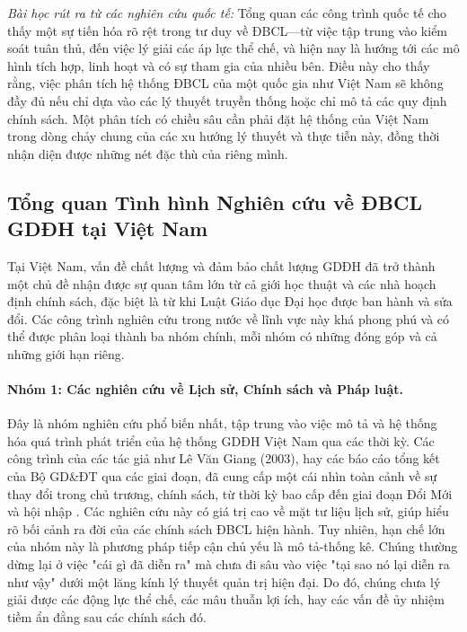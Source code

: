 \documentclass[12pt, a4paper, openany]{report}
\begin{document}
\textit{Bài học rút ra từ các nghiên cứu quốc tế:} Tổng quan các công trình quốc tế cho thấy một sự tiến hóa rõ rệt trong tư duy về ĐBCL—từ việc tập trung vào kiểm soát tuân thủ, đến việc lý giải các áp lực thể chế, và hiện nay là hướng tới các mô hình tích hợp, linh hoạt và có sự tham gia của nhiều bên. Điều này cho thấy rằng, việc phân tích hệ thống ĐBCL của một quốc gia như Việt Nam sẽ không đầy đủ nếu chỉ dựa vào các lý thuyết truyền thống hoặc chỉ mô tả các quy định chính sách. Một phân tích có chiều sâu cần phải đặt hệ thống của Việt Nam trong dòng chảy chung của các xu hướng lý thuyết và thực tiễn này, đồng thời nhận diện được những nét đặc thù của riêng mình.



\subsection{Tổng quan Tình hình Nghiên cứu về ĐBCL GDĐH tại Việt Nam}
\label{subsec:tong_quan_vietnam}

Tại Việt Nam, vấn đề chất lượng và đảm bảo chất lượng GDĐH đã trở thành một chủ đề nhận được sự quan tâm lớn từ cả giới học thuật và các nhà hoạch định chính sách, đặc biệt là từ khi Luật Giáo dục Đại học được ban hành và sửa đổi. Các công trình nghiên cứu trong nước về lĩnh vực này khá phong phú và có thể được phân loại thành ba nhóm chính, mỗi nhóm có những đóng góp và cả những giới hạn riêng.

\paragraph{Nhóm 1: Các nghiên cứu về Lịch sử, Chính sách và Pháp luật.}
Đây là nhóm nghiên cứu phổ biến nhất, tập trung vào việc mô tả và hệ thống hóa quá trình phát triển của hệ thống GDĐH Việt Nam qua các thời kỳ. Các công trình của các tác giả như Lê Văn Giang (2003), hay các báo cáo tổng kết của Bộ GD\&ĐT qua các giai đoạn, đã cung cấp một cái nhìn toàn cảnh về sự thay đổi trong chủ trương, chính sách, từ thời kỳ bao cấp đến giai đoạn Đổi Mới và hội nhập \cite{LeVanGiang2003, MOET_50nam}. Các nghiên cứu này có giá trị cao về mặt tư liệu lịch sử, giúp hiểu rõ bối cảnh ra đời của các chính sách ĐBCL hiện hành. Tuy nhiên, hạn chế lớn của nhóm này là phương pháp tiếp cận chủ yếu là mô tả-thống kê. Chúng thường dừng lại ở việc "cái gì đã diễn ra" mà chưa đi sâu vào việc "tại sao nó lại diễn ra như vậy" dưới một lăng kính lý thuyết quản trị hiện đại. Do đó, chúng chưa lý giải được các động lực thể chế, các mâu thuẫn lợi ích, hay các vấn đề ủy nhiệm tiềm ẩn đằng sau các chính sách đó.
\end{document}
